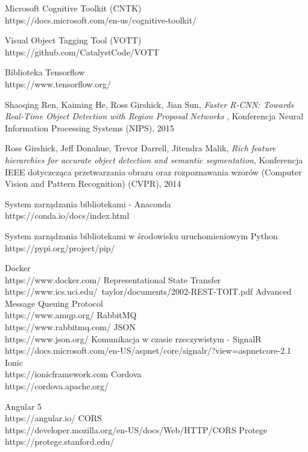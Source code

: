 \begin{thebibliography}{1}
 Microsoft Cognitive Toolkit (CNTK)
\\
https://docs.microsoft.com/en-us/cognitive-toolkit/

 Visual Object Tagging Tool (VOTT)
\\
https://github.com/CatalystCode/VOTT

 Biblioteka Tensorflow
\\
https://www.tensorflow.org/

 Shaoqing Ren, Kaiming He, Ross Girshick, Jian Sun,  {\em Faster R-CNN: Towards Real-Time Object Detection with Region Proposal Networks} , Konferencja Neural Information Processing Systems (NIPS), 2015

 Ross Girshick, Jeff Donahue, Trevor Darrell, Jitendra Malik, {\em Rich feature hierarchies for accurate object detection and semantic segmentation}, Konferencja IEEE dotyczcząca przetwarzania obrazu oraz rozpoznawania wzorów (Computer Vision and Pattern Recognition) (CVPR), 2014


 System zarządzania bibliotekami - Anaconda
\\
https://conda.io/docs/index.html

 System zarządzania bibliotekami w środowisku uruchomieniowym Python
\\
https://pypi.org/project/pip/


 Docker
\\
https://www.docker.com/
 Representational State Transfer
\\
https://www.ics.uci.edu/~taylor/documents/2002-REST-TOIT.pdf
Advanced Message Queuing Protocol
\\
https://www.amqp.org/
 RabbitMQ
\\
https://www.rabbitmq.com/
 JSON
\\
https://www.json.org/
 Komunikacja w czasie rzeczywistym - SignalR
\\
https://docs.microsoft.com/en-US/aspnet/core/signalr/?view=aspnetcore-2.1
 Ionic
\\
https://ionicframework.com
 Cordova
\\
https://cordova.apache.org/

 Angular 5
\\
https://angular.io/
CORS
\\
https://developer.mozilla.org/en-US/docs/Web/HTTP/CORS
Protege
\\
https://protege.stanford.edu/


\end{thebibliography}
